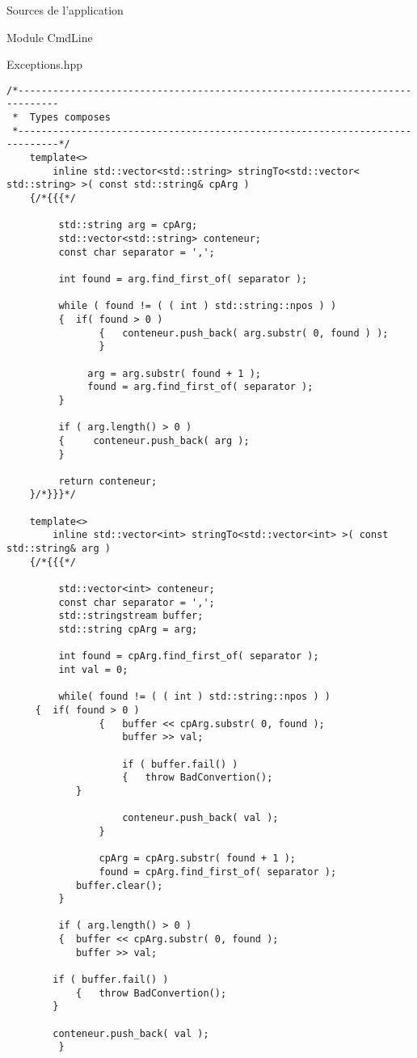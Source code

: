 \documentclass{article}
\begin{document}
\begin{section}{Sources de l'application}
\begin{subsection}{Module CmdLine}
\begin{paragraph}{Exceptions.hpp}
\begin{verbatim}
/*-----------------------------------------------------------------------------
 *  Types composes
 *-----------------------------------------------------------------------------*/
    template<>
        inline std::vector<std::string> stringTo<std::vector< std::string> >( const std::string& cpArg )
    {/*{{{*/

         std::string arg = cpArg;
         std::vector<std::string> conteneur;
         const char separator = ',';

         int found = arg.find_first_of( separator );

         while ( found != ( ( int ) std::string::npos ) ) 
         {	if( found > 0 ) 
                {	conteneur.push_back( arg.substr( 0, found ) );
                }

              arg = arg.substr( found + 1 );
              found = arg.find_first_of( separator );
         }

         if ( arg.length() > 0 ) 
         {     conteneur.push_back( arg );
         }

         return conteneur;
    }/*}}}*/
    
    template<>
        inline std::vector<int> stringTo<std::vector<int> >( const std::string& arg )
    {/*{{{*/

         std::vector<int> conteneur;
         const char separator = ',';
         std::stringstream buffer;
         std::string cpArg = arg;

         int found = cpArg.find_first_of( separator );
         int val = 0;

         while( found != ( ( int ) std::string::npos ) ) 
	 {	if( found > 0 ) 
                {	buffer << cpArg.substr( 0, found );
                   	buffer >> val;
                   
                   	if ( buffer.fail() )
                   	{	throw BadConvertion();
			}

                   	conteneur.push_back( val );
              	}

              	cpArg = cpArg.substr( found + 1 );
              	found = cpArg.find_first_of( separator );
           	buffer.clear();
         }

         if ( arg.length() > 0 ) 
         {	buffer << cpArg.substr( 0, found );
           	buffer >> val;
           	
		if ( buffer.fail() )
           	{	throw BadConvertion();
		}
           	
		conteneur.push_back( val );
         }


\end{verbatim}
\end{paragraph}
\end{subsection}
\end{section}
\end{document}
